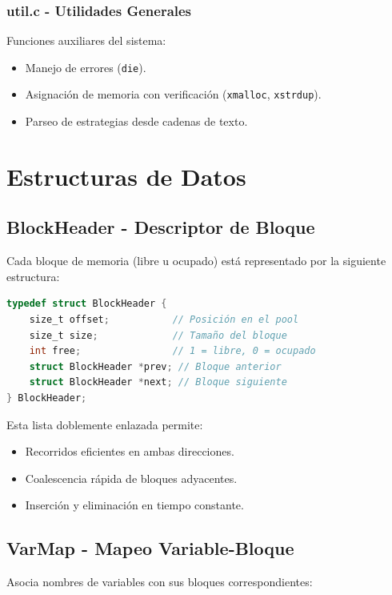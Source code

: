 \documentclass[12pt,a4paper]{article}
\begin{document}
\subsubsection{util.c - Utilidades Generales}

Funciones auxiliares del sistema:
\begin{itemize}
    \item Manejo de errores (\texttt{die}).
    \item Asignación de memoria con verificación (\texttt{xmalloc}, \texttt{xstrdup}).
    \item Parseo de estrategias desde cadenas de texto.
\end{itemize}

\section{Estructuras de Datos}

\subsection{BlockHeader - Descriptor de Bloque}

Cada bloque de memoria (libre u ocupado) está representado por la siguiente estructura:

\begin{lstlisting}[language=C]
typedef struct BlockHeader {
    size_t offset;           // Posición en el pool
    size_t size;             // Tamaño del bloque
    int free;                // 1 = libre, 0 = ocupado
    struct BlockHeader *prev; // Bloque anterior
    struct BlockHeader *next; // Bloque siguiente
} BlockHeader;
\end{lstlisting}

Esta lista doblemente enlazada permite:
\begin{itemize}
    \item Recorridos eficientes en ambas direcciones.
    \item Coalescencia rápida de bloques adyacentes.
    \item Inserción y eliminación en tiempo constante.
\end{itemize}

\subsection{VarMap - Mapeo Variable-Bloque}

Asocia nombres de variables con sus bloques correspondientes:
\end{document}
